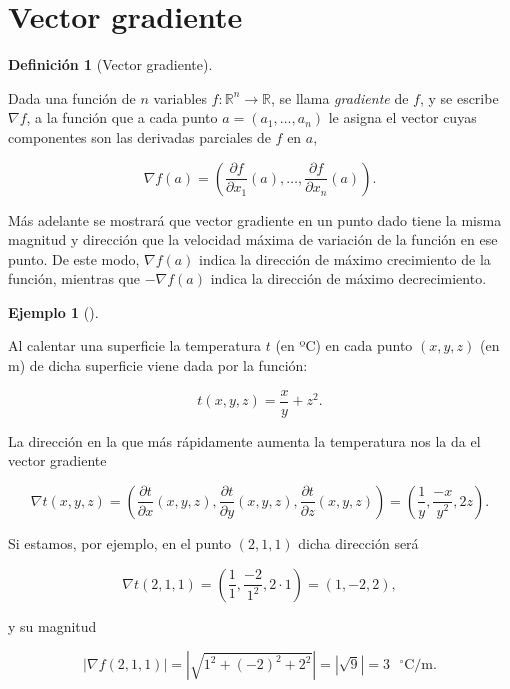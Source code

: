 \documentclass[
  a4paper,
]{scrreport}
\theoremstyle{plain}
\theoremstyle{plain}
\theoremstyle{definition}
\newtheorem{definition}{Definición}[chapter]
\theoremstyle{definition}
\newtheorem{example}{Ejemplo}[chapter]
\theoremstyle{plain}
\theoremstyle{definition}
\theoremstyle{remark}
\begin{document}
\hypertarget{vector-gradiente}{%
\section{Vector gradiente}\label{vector-gradiente}}

\begin{definition}[Vector
gradiente]\protect\hypertarget{def-vector-gradiente}{}\label{def-vector-gradiente}

Dada una función de \(n\) variables
\(f:\mathbb{R}^n\rightarrow \mathbb{R}\), se llama \emph{gradiente} de
\(f\), y se escribe \(\nabla f\), a la función que a cada punto
\(a=(a_1,\ldots,a_n)\) le asigna el vector cuyas componentes son las
derivadas parciales de \(f\) en \(a\),

\[\nabla f(a)=\left(\frac{\partial f}{\partial x_1}(a),\ldots,\frac{\partial f}{\partial x_n}(a)\right).\]

\end{definition}

Más adelante se mostrará que vector gradiente en un punto dado tiene la
misma magnitud y dirección que la velocidad máxima de variación de la
función en ese punto. De este modo, \(\nabla f(a)\) indica la dirección
de máximo crecimiento de la función, mientras que \(-\nabla f(a)\)
indica la dirección de máximo decrecimiento.

\begin{example}[]\protect\hypertarget{exm-vector-gradiente}{}\label{exm-vector-gradiente}

Al calentar una superficie la temperatura \(t\) (en ºC) en cada punto
\((x,y,z)\) (en m) de dicha superficie viene dada por la función:

\[
t(x,y,z)=\frac{x}{y}+z^2.
\]

La dirección en la que más rápidamente aumenta la temperatura nos la da
el vector gradiente

\[
\nabla t(x,y,z)=\left(\frac{\partial t}{\partial x}(x,y,z),\frac{\partial t}{\partial y}(x,y,z),\frac{\partial t}{\partial
z}(x,y,z)\right)=\left(\frac{1}{y},\frac{-x}{y^2},2z\right).
\]

Si estamos, por ejemplo, en el punto \((2,1,1)\) dicha dirección será

\[
\nabla t(2,1,1)=\left(\frac{1}{1},\frac{-2}{1^2},2\cdot 1\right)=(1,-2,2),
\]

y su magnitud

\[
|\nabla f(2,1,1)|=|\sqrt{1^2+(-2)^2+2^2}|=|\sqrt{9}|=3 \mbox{ $^\circ$C/m}.
\]

\end{example}
\end{document}
